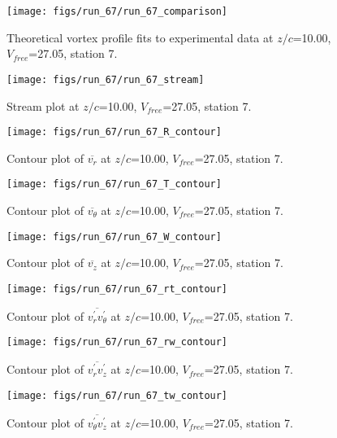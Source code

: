 \begin{figure}[H]
\centering
\texttt{[image: figs/run\_67/run\_67\_comparison]}
\caption{Theoretical vortex profile fits to experimental data at $z/c$=10.00, $V_{free}$=27.05, station 7.}
\end{figure}


\begin{figure}[H]
\centering
\texttt{[image: figs/run\_67/run\_67\_stream]}
\caption{Stream plot at $z/c$=10.00, $V_{free}$=27.05, station 7.}
\end{figure}


\begin{figure}[H]
\centering
\texttt{[image: figs/run\_67/run\_67\_R\_contour]}
\caption{Contour plot of $\overline{v_{r}}$ at $z/c$=10.00, $V_{free}$=27.05, station 7.}
\end{figure}


\begin{figure}[H]
\centering
\texttt{[image: figs/run\_67/run\_67\_T\_contour]}
\caption{Contour plot of $\overline{v_{\theta}}$ at $z/c$=10.00, $V_{free}$=27.05, station 7.}
\end{figure}


\begin{figure}[H]
\centering
\texttt{[image: figs/run\_67/run\_67\_W\_contour]}
\caption{Contour plot of $\overline{v_{z}}$ at $z/c$=10.00, $V_{free}$=27.05, station 7.}
\end{figure}


\begin{figure}[H]
\centering
\texttt{[image: figs/run\_67/run\_67\_rt\_contour]}
\caption{Contour plot of $\overline{v_{r}^{\prime} v_{\theta}^{\prime}}$ at $z/c$=10.00, $V_{free}$=27.05, station 7.}
\end{figure}


\begin{figure}[H]
\centering
\texttt{[image: figs/run\_67/run\_67\_rw\_contour]}
\caption{Contour plot of $\overline{v_{r}^{\prime} v_{z}^{\prime}}$ at $z/c$=10.00, $V_{free}$=27.05, station 7.}
\end{figure}


\begin{figure}[H]
\centering
\texttt{[image: figs/run\_67/run\_67\_tw\_contour]}
\caption{Contour plot of $\overline{v_{\theta}^{\prime} v_{z}^{\prime}}$ at $z/c$=10.00, $V_{free}$=27.05, station 7.}
\end{figure}


